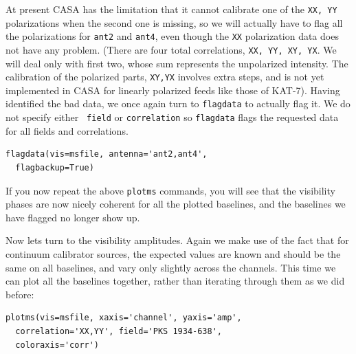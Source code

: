 \documentclass[force,almostfull,justified]{tufte-book}
\begin{document}
At present CASA has the limitation that it cannot calibrate one of the {\tt XX, YY} polarizations when
the second one is missing, so we will actually have to flag all the polarizations for {\tt ant2} and
{\tt ant4}, even though the {\tt XX} polarization data does not have any problem.  (There are four
total correlations, {\tt XX, YY, XY, YX}.  We will deal only with first two, whose sum represents the
unpolarized intensity.  The calibration of the polarized parts, {\tt XY,YX} involves extra steps, and
is not yet implemented in CASA for linearly polarized feeds like those of KAT-7).  Having identified
the bad data, we once again turn to {\tt flagdata} to actually flag it.  We do not specify either {\tt
field} or {\tt correlation} so {\tt flagdata} flags the requested data for all fields and
correlations.

\begin{casacmd}
\begin{verbatim}
flagdata(vis=msfile, antenna='ant2,ant4',
  flagbackup=True)
\end{verbatim}
\end{casacmd}


If you now repeat the above {\tt plotms} commands, you will see that the visibility phases are now
nicely coherent for all the plotted baselines, and the baselines we have flagged no longer show up.

Now lets turn to the visibility amplitudes.  Again we make use of the fact that for continuum
calibrator sources, the expected values are known and should be the same on all baselines, and vary
only slightly across the channels.  This time we can plot all the baselines together, rather than
iterating through them as we did before:

\begin{casacmd}
\begin{verbatim}
plotms(vis=msfile, xaxis='channel', yaxis='amp',
  correlation='XX,YY', field='PKS 1934-638',
  coloraxis='corr')
\end{verbatim}
\end{casacmd}
\end{document}
